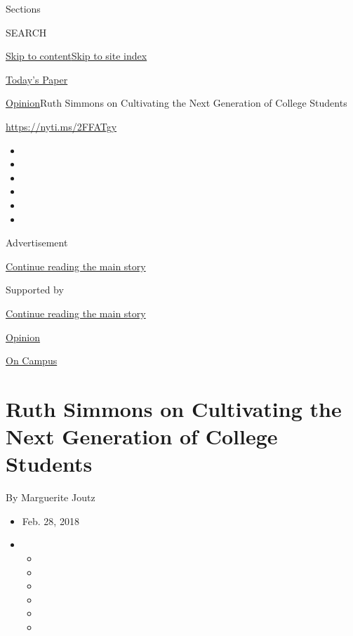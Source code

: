 Sections

SEARCH

\protect\hyperlink{site-content}{Skip to
content}\protect\hyperlink{site-index}{Skip to site index}

\href{https://myaccount.nytimes.com/auth/login?response_type=cookie\&client_id=vi}{}

\href{https://www.nytimes.com/section/todayspaper}{Today's Paper}

\href{/section/opinion}{Opinion}\textbar{}Ruth Simmons on Cultivating
the Next Generation of College Students

\href{https://nyti.ms/2FFATgy}{https://nyti.ms/2FFATgy}

\begin{itemize}
\item
\item
\item
\item
\item
\item
\end{itemize}

Advertisement

\protect\hyperlink{after-top}{Continue reading the main story}

Supported by

\protect\hyperlink{after-sponsor}{Continue reading the main story}

\href{/section/opinion}{Opinion}

\href{/column/on-campus}{On Campus}

\hypertarget{ruth-simmons-on-cultivating-the-next-generation-of-college-students}{%
\section{Ruth Simmons on Cultivating the Next Generation of College
Students}\label{ruth-simmons-on-cultivating-the-next-generation-of-college-students}}

By Marguerite Joutz

\begin{itemize}
\item
  Feb. 28, 2018
\item
  \begin{itemize}
  \item
  \item
  \item
  \item
  \item
  \item
  \end{itemize}
\end{itemize}

